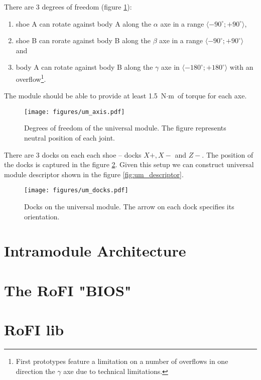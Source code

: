 There are 3 degrees of freedom (figure \ref{fig:um_axis}):
\begin{enumerate}
    \item shoe A can rotate against body A along the $\alpha$ axe in a range
    $\langle -90^\circ; +90^\circ\rangle$,
    \item shoe B can rorate against body B along the $\beta$ axe in a range
    $\langle -90^\circ; +90^\circ\rangle$ and
    \item body A can rotate against body B along the $\gamma$ axe in $\langle
    -180^\circ; +180^\circ\rangle$ with an overflow\footnote{First prototypes
    feature a limitation on a number of overflows in one direction the $\gamma$
    axe due to technical limitations. }.
\end{enumerate}
The module should be able to provide at least 1.5 $\text{N}\cdot\text{m}$ of
torque for each axe.

\begin{figure}
    \centering
    \texttt{[image: figures/um\_axis.pdf]}
    \caption{Degrees of freedom of the universal module. The figure represents neutral position of each joint.}
    \label{fig:um_axis}
\end{figure}

There are 3 docks on each each shoe -- docks $X+, X-$ and $Z-$. The position of
the docks is captured in the figure \ref{fig:um_docks}. Given this setup we
can construct universal module descriptor shown in the figure
\ref{fig:um_descriptor}.

\begin{figure}
    \centering
    \texttt{[image: figures/um\_docks.pdf]}
    \caption{Docks on the universal module. The arrow on each dock specifies its orientation.}
    \label{fig:um_docks}
\end{figure}

\section{Intramodule Architecture}

\section{The RoFI "BIOS" }

\section{RoFI lib}

